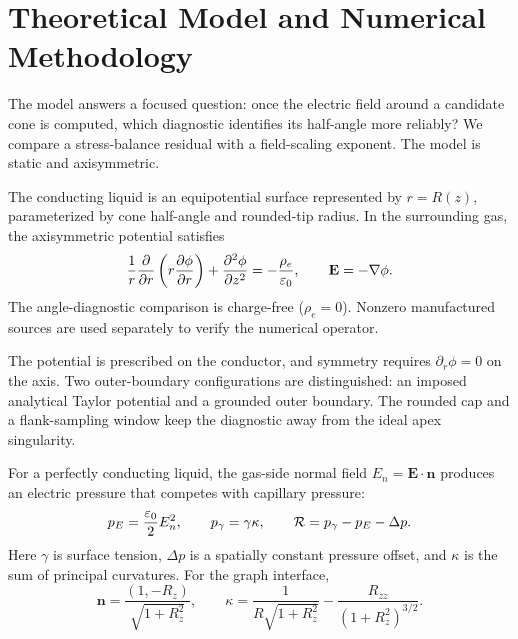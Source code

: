 \section{Theoretical Model and Numerical Methodology}

The model answers a focused question: once the electric field around a candidate cone is computed, which diagnostic identifies its half-angle more reliably? We compare a stress-balance residual with a field-scaling exponent. The model is static and axisymmetric.

The conducting liquid is an equipotential surface represented by $r=R(z)$, parameterized by cone half-angle and rounded-tip radius. In the surrounding gas, the axisymmetric potential satisfies
\begin{equation}
\frac{1}{r}\frac{\partial}{\partial r}\left(r\frac{\partial\phi}{\partial r}\right)
+\frac{\partial^2\phi}{\partial z^2}=-\frac{\rho_e}{\varepsilon_0},
\qquad \mathbf E=-\nabla\phi.
\end{equation}
The angle-diagnostic comparison is charge-free ($\rho_e=0$). Nonzero manufactured sources are used separately to verify the numerical operator.

The potential is prescribed on the conductor, and symmetry requires $\partial_r\phi=0$ on the axis. Two outer-boundary configurations are distinguished: an imposed analytical Taylor potential and a grounded outer boundary.  The rounded cap and a flank-sampling window keep the diagnostic away from the ideal apex singularity.

 For a perfectly conducting liquid, the gas-side normal field $E_n=\mathbf E\cdot\mathbf n$ produces an electric pressure that competes with capillary pressure:
\begin{equation}
 p_E=\frac{\varepsilon_0}{2}E_n^2,\qquad p_\gamma=\gamma\kappa,
 \qquad \mathcal R=p_\gamma-p_E-\Delta p.
\end{equation}
Here $\gamma$ is surface tension, $\Delta p$ is a spatially constant pressure offset, and $\kappa$ is the sum of principal curvatures. For the graph interface,
\begin{equation}
\mathbf n=\frac{(1,-R_z)}{\sqrt{1+R_z^2}},\qquad
\kappa=\frac{1}{R\sqrt{1+R_z^2}}-\frac{R_{zz}}{(1+R_z^2)^{3/2}}.
\end{equation}

